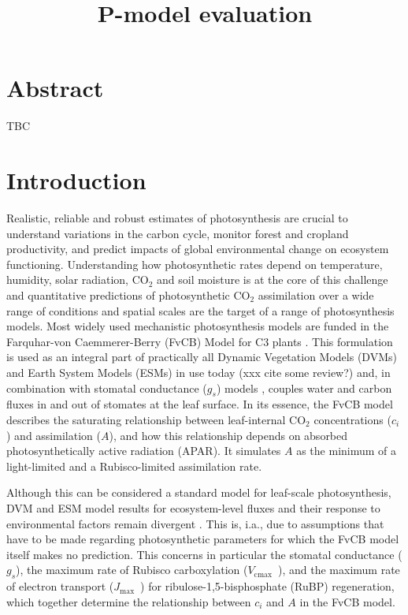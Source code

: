 \documentclass{myreport}
\newcommand{\vcmax}{$V_{\text{cmax}}$}
\newcommand{\jmax}{$J_{\text{max}}$}
\begin{document}
\pagestyle{headings}

% 

\title{P-model evaluation}

\maketitle

\tableofcontents

\section*{Abstract}

TBC

\section{Introduction}

Realistic, reliable and robust estimates of photosynthesis are crucial to understand variations in the carbon cycle, monitor forest and cropland productivity, and predict impacts of global environmental change on ecosystem functioning. Understanding how photosynthetic rates depend on temperature, humidity, solar radiation, CO$_2$ and soil moisture is at the core of this challenge and quantitative predictions of photosynthetic CO$_2$ assimilation over a wide range of conditions and spatial scales are the target of a range of photosynthesis models. Most widely used mechanistic photosynthesis models are funded in the Farquhar-von Caemmerer-Berry (FvCB) Model for C3 plants \citep{farquhar80, voncaemmerer81}. This formulation is used as an integral part of practically all Dynamic Vegetation Models (DVMs) and Earth System Models (ESMs) in use today (xxx cite some review?) and, in combination with stomatal conductance ($g_s$) models \citep{ball87, leuning95pce, medlyn11gcb}, couples water and carbon fluxes in and out of stomates at the leaf surface. In its essence, the FvCB model describes the saturating relationship between leaf-internal CO$_2$ concentrations ($c_i$) and assimilation ($A$), and how this relationship depends on absorbed photosynthetically active radiation (APAR). It simulates $A$ as the minimum of a light-limited and a Rubisco-limited assimilation rate. 

Although this can be considered a standard model for leaf-scale photosynthesis, DVM and ESM model results for ecosystem-level fluxes and their response to environmental factors remain divergent \citep{rogers17}. This is, i.a., due to assumptions that have to be made regarding photosynthetic parameters for which the FvCB model itself makes no prediction. This concerns in particular the stomatal conductance ($g_s$), the maximum rate of Rubisco carboxylation (\vcmax\ ), and the maximum rate of electron transport (\jmax\ ) for ribulose-1,5-bisphosphate (RuBP) regeneration, which together determine the relationship between $c_i$ and $A$ in the FvCB model. 
\end{document}
